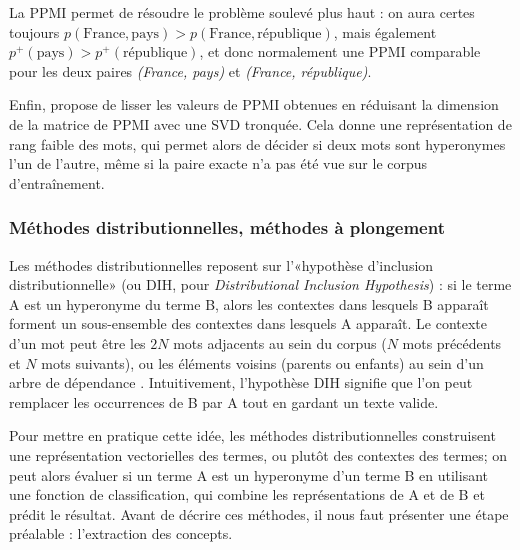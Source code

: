 La PPMI permet de résoudre le problème soulevé plus haut : on aura certes toujours $p(\textrm{France}, \textrm{pays}) > p(\textrm{France}, \textrm{république})$, mais également $p^+(\textrm{pays}) > p^+(\textrm{république})$, et donc normalement une PPMI comparable pour les deux paires \textit{(France, pays)} et \textit{(France, république)}.

Enfin, \cite{roller-etal-2018-hearst} propose de lisser les valeurs de PPMI obtenues en réduisant la dimension de la matrice de PPMI avec une SVD tronquée. Cela donne une représentation de rang faible des mots, qui permet alors de décider si deux mots sont hyperonymes l'un de l'autre, même si la paire exacte n'a pas été vue sur le corpus d'entraînement.


\subsubsection{Méthodes distributionnelles, méthodes à plongement}

Les méthodes distributionnelles reposent sur l'«hypothèse d'inclusion distributionnelle» (ou DIH, pour \textit{Distributional Inclusion Hypothesis}) \cite{geffet2005distributional} : si le terme A est un hyperonyme du terme B, alors les contextes dans lesquels B apparaît forment un sous-ensemble des contextes dans lesquels A apparaît. Le contexte d'un mot peut être les $2N$ mots adjacents au sein du corpus ($N$ mots précédents et $N$ mots suivants), ou les éléments voisins (parents ou enfants) au sein d'un arbre de dépendance \cite{shwartz-etal-2017-hypernyms}.
Intuitivement, l'hypothèse DIH signifie que l'on peut remplacer les occurrences de B par A tout en gardant un texte valide.

Pour mettre en pratique cette idée, les méthodes distributionnelles construisent une représentation vectorielles des termes, ou plutôt des contextes des termes; on peut alors évaluer si un terme A est un hyperonyme d'un terme B en utilisant une fonction de classification, qui combine les représentations de A et de B et prédit le résultat. Avant de décrire ces méthodes, il nous faut présenter une étape préalable : l'extraction des concepts.


